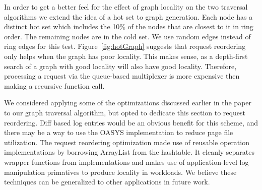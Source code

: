 \documentclass[10pt,letterpaper,twocolumn,english]{article}
\begin{document}
In order to get a better feel for the effect of graph locality on the
two traversal algorithms we extend the idea of a hot set to graph
generation.  Each node has a distinct hot set which includes the 10\%
of the nodes that are closest to it in ring order.  The remaining
nodes are in the cold set.  We use random edges instead of ring edges
for this test.  Figure~\ref{fig:hotGraph} suggests that request reordering 
only helps when the graph has poor locality.  This makes sense, as a 
depth-first search of a graph with good locality will also have good 
locality.  Therefore, processing a request via the queue-based multiplexer 
is more expensive then making a recursive function call.

We considered applying some of the optimizations discussed earlier in
the paper to our graph traversal algorithm, but opted to dedicate this
section to request reordering.  Diff based log entries would be an
obvious benefit for this scheme, and there may be a way to use the
OASYS implementation to reduce page file utilization.  The request 
reordering optimization made use of reusable operation implementations 
by borrowing ArrayList from the hashtable.  It cleanly separates wrapper 
functions from implementations and makes use of application-level log 
manipulation primatives to produce locality in workloads.  We believe 
these techniques can be generalized to other applications in future work.
\end{document}
